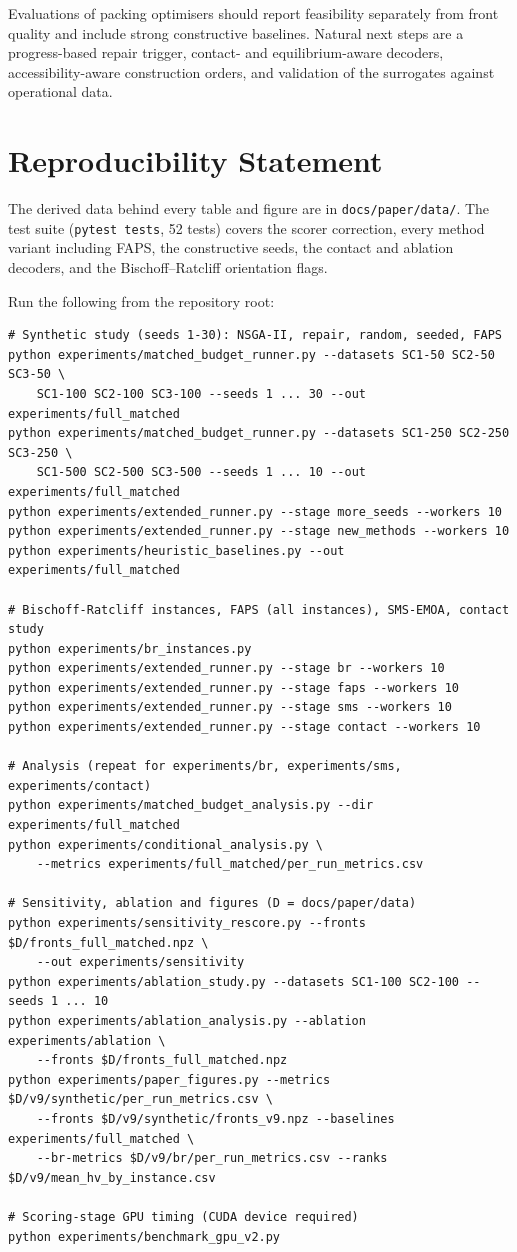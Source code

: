 \documentclass[journal]{IEEEtran}
\begin{document}
Evaluations of packing optimisers should report feasibility separately from front quality and include strong constructive baselines. Natural next steps are a progress-based repair trigger, contact- and equilibrium-aware decoders, accessibility-aware construction orders, and validation of the surrogates against operational data.

\section*{Reproducibility Statement}

The derived data behind every table and figure are in \texttt{docs/paper/data/}. The test suite (\texttt{pytest\ tests}, 52 tests) covers the scorer correction, every method variant including FAPS, the constructive seeds, the contact and ablation decoders, and the Bischoff--Ratcliff orientation flags.

Run the following from the repository root:

{\tiny
\begin{verbatim}
# Synthetic study (seeds 1-30): NSGA-II, repair, random, seeded, FAPS
python experiments/matched_budget_runner.py --datasets SC1-50 SC2-50 SC3-50 \
    SC1-100 SC2-100 SC3-100 --seeds 1 ... 30 --out experiments/full_matched
python experiments/matched_budget_runner.py --datasets SC1-250 SC2-250 SC3-250 \
    SC1-500 SC2-500 SC3-500 --seeds 1 ... 10 --out experiments/full_matched
python experiments/extended_runner.py --stage more_seeds --workers 10
python experiments/extended_runner.py --stage new_methods --workers 10
python experiments/heuristic_baselines.py --out experiments/full_matched

# Bischoff-Ratcliff instances, FAPS (all instances), SMS-EMOA, contact study
python experiments/br_instances.py
python experiments/extended_runner.py --stage br --workers 10
python experiments/extended_runner.py --stage faps --workers 10
python experiments/extended_runner.py --stage sms --workers 10
python experiments/extended_runner.py --stage contact --workers 10

# Analysis (repeat for experiments/br, experiments/sms, experiments/contact)
python experiments/matched_budget_analysis.py --dir experiments/full_matched
python experiments/conditional_analysis.py \
    --metrics experiments/full_matched/per_run_metrics.csv

# Sensitivity, ablation and figures (D = docs/paper/data)
python experiments/sensitivity_rescore.py --fronts $D/fronts_full_matched.npz \
    --out experiments/sensitivity
python experiments/ablation_study.py --datasets SC1-100 SC2-100 --seeds 1 ... 10
python experiments/ablation_analysis.py --ablation experiments/ablation \
    --fronts $D/fronts_full_matched.npz
python experiments/paper_figures.py --metrics $D/v9/synthetic/per_run_metrics.csv \
    --fronts $D/v9/synthetic/fronts_v9.npz --baselines experiments/full_matched \
    --br-metrics $D/v9/br/per_run_metrics.csv --ranks $D/v9/mean_hv_by_instance.csv

# Scoring-stage GPU timing (CUDA device required)
python experiments/benchmark_gpu_v2.py
\end{verbatim}
}
\end{document}

